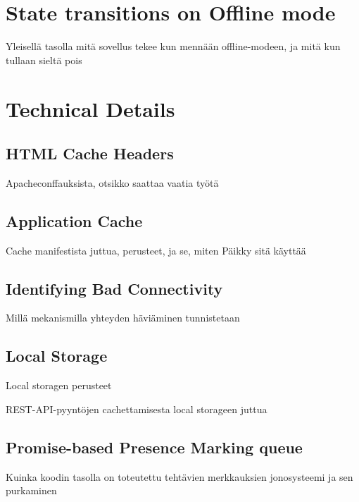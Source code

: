 \section{State transitions on Offline mode}
Yleisellä tasolla mitä sovellus tekee kun mennään offline-modeen, ja mitä kun tullaan sieltä pois






\section{Technical Details}

\subsection{HTML Cache Headers}
Apacheconffauksista, otsikko saattaa vaatia työtä

\subsection{Application Cache}
Cache manifestista juttua, perusteet, ja se, miten Päikky sitä käyttää


\subsection{Identifying Bad Connectivity}
Millä mekanismilla yhteyden häviäminen tunnistetaan


\subsection{Local Storage}
Local storagen perusteet

REST-API-pyyntöjen cachettamisesta local storageen juttua

\subsection{Promise-based Presence Marking queue}
Kuinka koodin tasolla on toteutettu tehtävien merkkauksien jonosysteemi ja sen purkaminen

